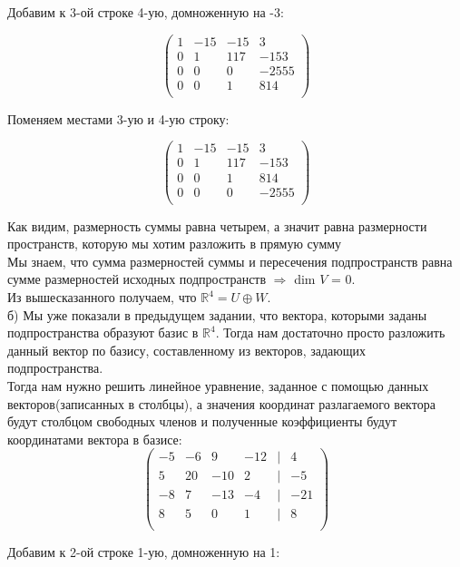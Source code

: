 	Добавим к 3-ой строке 4-ую, домноженную на -3:
	
	\[
	\begin{pmatrix}
	1 & -15 & -15 & 3 \\
	0 & 1 & 117 & -153 \\
	0 & 0 & 0 & -2555 \\
	0 & 0 & 1 & 814 \\
	\end{pmatrix}
	\]
	
	Поменяем местами 3-ую и 4-ую строку:
	
	\[
	\begin{pmatrix}
	1 & -15 & -15 & 3 \\
	0 & 1 & 117 & -153 \\
	0 & 0 & 1 & 814 \\
	0 & 0 & 0 & -2555 \\
	\end{pmatrix}
	\]
	
	Как видим, размерность суммы равна четырем, а значит равна размерности пространств, которую мы хотим разложить в прямую сумму \\
	Мы знаем, что сумма размерностей суммы и пересечения подпространств равна сумме размерностей исходных подпространств $\Rightarrow$ dim $V$ = 0.  \\
	Из вышесказанного получаем, что $\mathbb{R}^4 = U \oplus W$. \\
	
	
	б) Мы уже показали в предыдущем задании, что вектора, которыми заданы подпространства образуют базис в $\mathbb{R}^4$. Тогда нам достаточно просто разложить данный вектор по базису, составленному из векторов, задающих подпространства. \\
	
	Тогда нам нужно решить линейное уравнение, заданное с помощью данных векторов(записанных в столбцы), а значения координат разлагаемого вектора будут столбцом свободных членов и полученные коэффициенты будут координатами вектора в базисе:\\
		
	
	\[
	\begin{pmatrix}
	-5 & -6 & 9 & -12 & | & 4 \\
	5 & 20 & -10 & 2 & | & -5 \\
	-8 & 7 & -13 & -4 & | & -21 \\
	8 & 5 & 0 & 1 & | & 8 \\
	\end{pmatrix}
	\]
	
	Добавим к 2-ой строке 1-ую, домноженную на 1:
	
